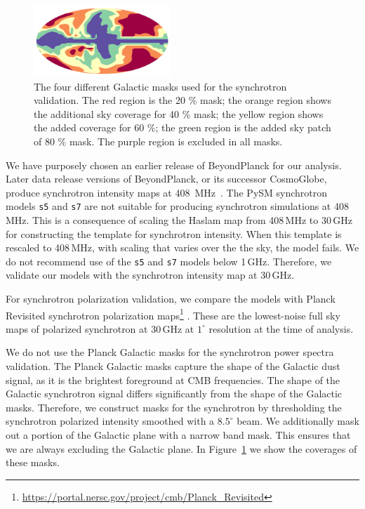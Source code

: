 \documentclass[twocolumn]{aastex631}
\begin{document}
\begin{figure}
    \centering
    \includegraphics[width=0.46\textwidth]{figures/SYNC_mask_stack.png}
    \caption{The four different Galactic masks used for the synchrotron validation. The red region is the 20 \% mask; the orange region shows the additional sky coverage for 40 \% mask; the yellow region shows the added coverage for 60 \%; the green region is the added sky patch of 80 \% mask. The purple region is excluded in all masks. }
    \label{fig:sync_masks}
\end{figure}

We have purposely chosen an earlier release of BeyondPlanck for our analysis. Later data release versions of BeyondPlanck, or its successor CosmoGlobe, produce synchrotron intensity maps at 408~MHz~\citep{Watts:2023}. The PySM synchrotron models \texttt{s5} and \texttt{s7} are not suitable for producing synchrotron simulations at 408\,MHz. This is a consequence of scaling the Haslam map from 408\,MHz to 30\,GHz for constructing the template for synchrotron intensity. When this template is rescaled to 408\,MHz, with scaling that varies over the the sky, the model fails. We do not recommend use of the \texttt{s5} and \texttt{s7} models below 1\,GHz. Therefore, we validate our models with the synchrotron intensity map at 30\,GHz.

For synchrotron polarization validation, we compare the models with Planck Revisited synchrotron polarization maps\footnote{\url{https://portal.nersc.gov/project/cmb/Planck\_Revisited}} \citep{Delabrouille:2024}. These are the lowest-noise full sky maps of polarized synchrotron at 30\,GHz at $1^\circ$ resolution at the time of analysis. 

We do not use the Planck Galactic masks for the synchrotron power spectra validation. The Planck Galactic masks capture the shape of the Galactic dust signal, as it is the brightest foreground at CMB frequencies. The shape of the Galactic synchrotron signal differs significantly from the shape of the Galactic masks. Therefore, we construct masks for the synchrotron by thresholding the synchrotron polarized intensity smoothed with a $8.5^\circ$ beam. We additionally mask out a portion of the Galactic plane with a narrow band mask. This ensures that we are always excluding the Galactic plane. In Figure~\ref{fig:sync_masks} we show the coverages of these masks. 
\end{document}
